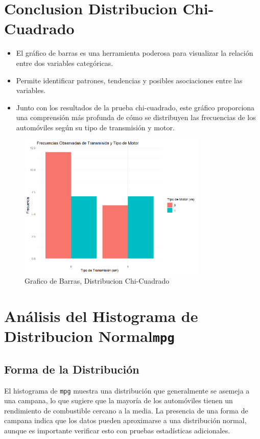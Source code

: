 \documentclass{article}
\begin{document}
\section{Conclusion Distribucion Chi-Cuadrado}
\begin{itemize}
    \item El gráfico de barras es una herramienta poderosa para visualizar la relación entre dos variables categóricas.
    \item Permite identificar patrones, tendencias y posibles asociaciones entre las variables.
    \item Junto con los resultados de la prueba chi-cuadrado, este gráfico proporciona una comprensión más profunda de cómo se distribuyen las frecuencias de los automóviles según su tipo de transmisión y motor.
\end{itemize}
\begin{figure}[H] %
    \centering %
    \includegraphics[width=0.8\textwidth]{Imagen2.png}
    \caption{Grafico de Barras, Distribucion Chi-Cuadrado} %
    \label{fig:mi_imagen} %
\end{figure}

\section{Análisis del Histograma de Distribucion Normal\texttt{mpg} }

\subsection{Forma de la Distribución}
El histograma de \texttt{mpg} muestra una distribución que generalmente se asemeja a una campana, lo que sugiere que la mayoría de los automóviles tienen un rendimiento de combustible cercano a la media. La presencia de una forma de campana indica que los datos pueden aproximarse a una distribución normal, aunque es importante verificar esto con pruebas estadísticas adicionales.
\end{document}
